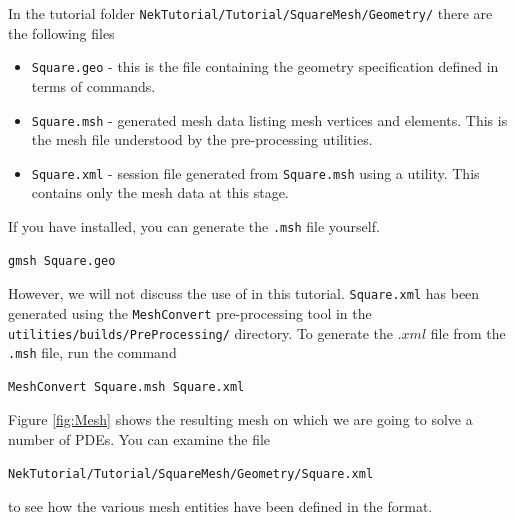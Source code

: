 \documentclass[a4paper,12pt]{article}
\begin{document}
In the tutorial folder \texttt{NekTutorial/Tutorial/SquareMesh/Geometry/} there
are the following files
\begin{itemize}
\item \texttt{Square.geo} - this is the file containing the geometry
specification defined in terms of \gmsh commands.
\item \texttt{Square.msh} - \gmsh generated mesh data listing mesh vertices and
elements. This is the mesh file understood by the \nektar pre-processing
utilities.
\item \texttt{Square.xml} - \nektar session file generated from
\texttt{Square.msh} using a \nektar utility. This contains only the mesh data at
this stage.
\end{itemize}

If you have \gmsh installed, you can generate the \texttt{.msh} file yourself.

\begin{verbatim}
gmsh Square.geo
\end{verbatim}

However, we will not discuss the use of
\gmsh in this tutorial. \texttt{Square.xml} has been generated using the
\texttt{MeshConvert} pre-processing tool in the \\
\texttt{utilities/builds/PreProcessing/} directory. To generate the $.xml$ file
from the \texttt{.msh} file, run the command

\begin{verbatim}
MeshConvert Square.msh Square.xml
\end{verbatim}

Figure \ref{fig:Mesh} shows the resulting mesh on which we are going to
solve a number of PDEs. You can examine the file

\begin{verbatim}
NekTutorial/Tutorial/SquareMesh/Geometry/Square.xml
\end{verbatim}

to see how the various mesh entities have been defined in the \nektar format.
\end{document}
